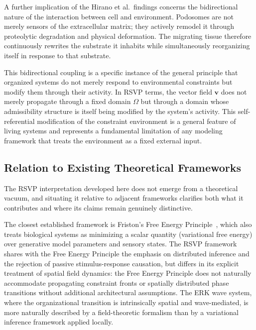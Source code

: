 \documentclass[11pt,a4paper]{article}
\theoremstyle{plain}
\theoremstyle{definition}
\begin{document}
A further implication of the Hirano et al.\ findings concerns the bidirectional nature
of the interaction between cell and environment. Podosomes are not merely sensors of
the extracellular matrix; they actively remodel it through proteolytic degradation and
physical deformation. The migrating tissue therefore continuously rewrites the substrate
it inhabits while simultaneously reorganizing itself in response to that substrate.

This bidirectional coupling is a specific instance of the general principle that
organized systems do not merely respond to environmental constraints but modify them
through their activity. In RSVP terms, the vector field $\mathbf{v}$ does not merely
propagate through a fixed domain $\Omega$ but through a domain whose admissibility
structure is itself being modified by the system's activity. This self-referential
modification of the constraint environment is a general feature of living systems
and represents a fundamental limitation of any modeling framework that treats the
environment as a fixed external input.

\subsection{Relation to Existing Theoretical Frameworks}

The RSVP interpretation developed here does not emerge from a theoretical vacuum, and
situating it relative to adjacent frameworks clarifies both what it contributes and
where its claims remain genuinely distinctive.

The closest established framework is Friston's Free Energy Principle~\cite{Friston2010},
which also treats biological systems as minimizing a scalar quantity (variational free
energy) over generative model parameters and sensory states. The RSVP framework shares
with the Free Energy Principle the emphasis on distributed inference and the rejection
of passive stimulus-response causation, but differs in its explicit treatment of
spatial field dynamics: the Free Energy Principle does not naturally accommodate
propagating constraint fronts or spatially distributed phase transitions without
additional architectural assumptions. The ERK wave system, where the organizational
transition is intrinsically spatial and wave-mediated, is more naturally described
by a field-theoretic formalism than by a variational inference framework applied locally.
\end{document}
